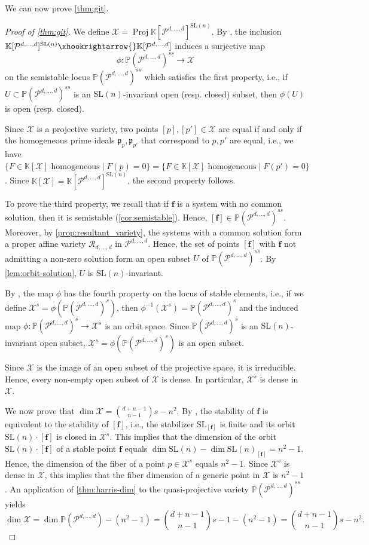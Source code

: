 \documentclass[11pt,a4paper]{article}
\numberwithin{equation}{section}
\newcommand{\PP}{\mathbb{P}}
\newcommand{\KK}{\mathbb{K}}
\newcommand{\cR}{\mathcal{R}}
\newcommand{\cX}{\mathcal{X}}
\newcommand{\cP}{\mathcal{P}}
\newcommand{\ff}{\ensuremath{\boldsymbol{f}}}
\newcommand{\SL}{\mathrm{SL}}
\DeclareMathOperator{\Proj}{Proj}
\begin{document}
We can now prove \cref{thm:git}.
\begin{proof}[Proof of \cref{thm:git}]
We define $\cX=\Proj \KK[\cP^{d,\dots,d}]^{\SL(n)}$.
By \cite[Theorem~4.11]{Hoskins-12}, the inclusion $\KK[\cP^{d,\dots,d}]^{\SL(n)}\xhookrightarrow{} \KK[\cP^{d,\dots,d}]$ induces a surjective map \[
\phi: \PP(\cP^{d,\dots,d})^{ss} \rightarrow \cX
\] on the semistable locus $\PP(\cP^{d,\dots,d})^{ss}$ which satisfies the first property, i.e., if $U\subset\PP(\cP^{d,\dots,d})^{ss}$ is an $\SL(n)$-invariant open (resp. closed) subset, then $\phi(U)$ is open (resp. closed).

Since $\cX$ is a projective variety, two points $[p],[p']\in\cX$ are equal if and only if the homogeneous prime ideals $\mathfrak{p}_{p}, \mathfrak{p}_{p'}$ that correspond to $p,p'$ are equal, i.e., we have $\{F\in\KK[\cX] \text{ homogeneous}\mid F(p)=0\}=\{F\in\KK[\cX]\text{ homogeneous}\mid F(p')=0\}$.
Since $\KK[\cX]=\KK[\cP^{d,\dots,d}]^{\SL(n)}$, the second property follows.

To prove the third property, we recall that if $\ff$ is a system with no common solution, then it is semistable (\cref{cor:semistable}).
Hence, $[\ff]\in \PP(\cP^{d,\dots,d})^{ss}$. 
Moreover, by \cref{prop:resultant_variety}, the systems with a common solution form a proper affine variety $\cR_{d,\dots,d}$ in $\cP^{d,\dots,d}$.
Hence, the set of points $[\ff]$ with $\ff$ not admitting a non-zero solution form an open subset $U$ of $\PP(\cP^{d,\dots,d})^{ss}$.
By \cref{lem:orbit-solution}, $U$ is $\SL(n)$-invariant.

By \cite[Theorem~4.11 (iii)]{Hoskins-12}, the map $\phi$ has the fourth property on the locus of stable elements, i.e., if we define $\cX^s=\phi(\PP(\cP^{d,\dots,d})^s)$, then $\phi^{-1}(\cX^s)=\PP(\cP^{d,\dots,d})^s$ and the induced map $\phi:\PP(\cP^{d,\dots,d})^s\rightarrow\cX^{s}$ is an orbit space.
Since $\PP(\cP^{d,\dots,d})^s$ is an $\SL(n)$-invariant open subset, $\cX^s=\phi(\PP(\cP^{d,\dots,d})^s)$ is an open subset.

Since $\cX$ is the image of an open subset of the projective space, it is irreducible.
Hence, every non-empty open subset of $\cX$ is dense.
In particular, $\cX^s$ is dense in $\cX$.

We now prove that $\dim\cX=\binom{d+n-1}{n-1}s-n^2$.
By \cite[Proposition~5.1]{Hoskins-12}, the stability of  $\ff$ is equivalent to the stability of $[\ff]$, i.e., the stabilizer $\SL_{[\ff]}$ is finite and its orbit $\SL(n)\cdot [\ff]$ is closed in $\cX^{s}$. 
This implies that the dimension of the orbit $\SL(n)\cdot [\ff]$ of a stable point $\ff$ equals $\dim\SL(n)-\dim\SL(n)_{[\ff]}=n^2-1$.
Hence, the dimension of the fiber of a point $p\in\cX^s$ equals $n^2-1$.
Since $\cX^s$ is dense in $\cX$, this implies that the fiber dimension of a generic point in $\cX$ is $n^2-1$.
An application of \cref{thm:harris-dim} to the quasi-projective variety $\PP(\cP^{d,\dots,d})^{ss}$ yields \[
\dim\cX = \dim \PP(\cP^{d,\dots,d}) - (n^2-1) =\binom{d+n-1}{n-1}s- 1 - (n^2-1)=\binom{d+n-1}{n-1}s-n^2.
\] 
\end{proof}
\end{document}
